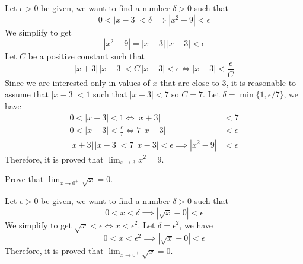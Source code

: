 \begin{solution}
    Let \(\epsilon>0\) be given, we want to find a number \(\delta>0\) such
    that \[0<|x-3|<\delta \implies |x^2-9|<\epsilon\]
    We simplify to get \[|x^2-9|=|x+3|\,|x-3|<\epsilon\]
    Let \(C\) be a positive constant such that
    \[|x+3|\,|x-3|<C\,|x-3|<\epsilon \iff |x-3|<\frac{\epsilon}{C}\]
    Since we are interested only in values of \(x\) that are close to 3, it is
    reasonable to assume that \(|x-3|<1\) such that \(|x+3|<7\) so \(C=7\).
    Let \(\delta=\min\{1,\epsilon/7\}\), we have
    \begin{align*}
        0<|x-3|<1 \iff |x+3|&<7 \\
        0<|x-3|<\frac{\epsilon}{7} \iff 7\,|x-3|&<\epsilon \\
        |x+3|\,|x-3|<7\,|x-3|<\epsilon \implies |x^2-9|&<\epsilon
    \end{align*}
    Therefore, it is proved that \(\displaystyle{\lim_{x\to 3}x^2=9}\).
\end{solution}
\begin{problem}
    Prove that \(\displaystyle{\lim_{x\to 0^+}\sqrt{x}=0}\).
\end{problem}
\begin{solution}
    Let \(\epsilon>0\) be given, we want to find a number \(\delta>0\) such
    that \[0<x<\delta\implies|\sqrt{x}-0|<\epsilon\]
    We simplify to get \(\sqrt{x}<\epsilon\iff x<\epsilon^2\).
    Let \(\delta=\epsilon^2\), we have
    \[0<x<\epsilon^2\implies|\sqrt{x}-0|<\epsilon\]
    Therefore, it is proved that \(\displaystyle{\lim_{x\to 0^+}\sqrt{x}=0}\).
\end{solution}